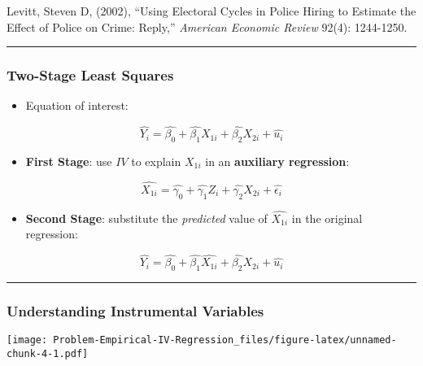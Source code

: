 \documentclass[
]{article}
\providecommand{\tightlist}{%
  \setlength{\itemsep}{0pt}\setlength{\parskip}{0pt}}
\begin{document}
Levitt, Steven D, (2002), ``Using Electoral Cycles in Police Hiring to
Estimate the Effect of Police on Crime: Reply,'' \emph{American Economic
Review} 92(4): 1244-1250.

\begin{center}\rule{0.5\linewidth}{0.5pt}\end{center}

\hypertarget{two-stage-least-squares}{%
\subsubsection{Two-Stage Least Squares}\label{two-stage-least-squares}}

\begin{itemize}
\tightlist
\item
  Equation of interest:
\end{itemize}

\[
\widehat{Y_i} 
    = \widehat{\beta_0} 
    + \widehat{\beta_1} X_{1i} 
    + \widehat{\beta_2} X_{2i}
    + \widehat{u_i}
\]

\begin{itemize}
\tightlist
\item
  \textbf{First Stage}: use \(IV\) to explain \(X_{1i}\) in an
  \textbf{auxiliary regression}:
\end{itemize}

\[
\widehat{X_{1i}} 
    = \hat{\gamma_0} 
    + \hat{\gamma_1} Z_i 
    + \hat{\gamma_2} X_{2i} 
    + \hat{\epsilon_i}
\]

\begin{itemize}
\tightlist
\item
  \textbf{Second Stage}: substitute the \emph{predicted} value of
  \(\widehat{X_{1i}}\) in the original regression:
\end{itemize}

\[
\widehat{Y_i}
    = \hat{\beta_0}
    + \hat{\beta_1} \widehat{X_{1i}}
    + \hat{\beta_2} X_{2i}
    + \hat{u_i}
\]

\begin{center}\rule{0.5\linewidth}{0.5pt}\end{center}

\hypertarget{understanding-instrumental-variables-1}{%
\subsubsection{Understanding Instrumental
Variables}\label{understanding-instrumental-variables-1}}

\texttt{[image: Problem-Empirical-IV-Regression\_files/figure-latex/unnamed-chunk-4-1.pdf]}
\end{document}
